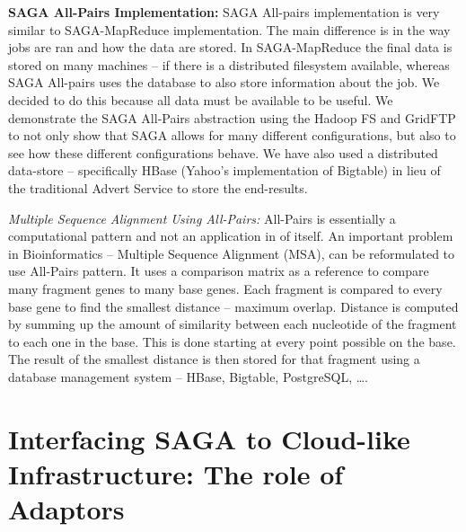 \documentclass[conference,final]{IEEEtran}
\newcommand{\sagamapreduce }{SAGA-MapReduce }
\begin{document}

{\bf SAGA All-Pairs Implementation: } SAGA All-pairs implementation is
very similar to \sagamapreduce implementation.  The main difference is
in the way jobs are ran and how the data are stored.  In
\sagamapreduce the final data is stored on many machines -- if there
is a distributed filesystem available, whereas SAGA All-pairs uses the
database to also store information about the job.  We decided to do
this because all data must be available to be useful. We demonstrate 
the SAGA All-Pairs abstraction using the Hadoop FS and GridFTP to not 
only show that SAGA allows for many different configurations, but also to
see how these different configurations behave. We have also used a 
distributed data-store -- specifically HBase 
(Yahoo's implementation of Bigtable) in lieu of the traditional
Advert Service to store the end-results.


{\it Multiple Sequence Alignment Using All-Pairs:} All-Pairs is
essentially a computational pattern and not an application in of
itself. An important problem in Bioinformatics -- Multiple Sequence
Alignment (MSA), can be reformulated to use All-Pairs pattern. It uses
a comparison matrix as a reference to compare many fragment genes to
many base genes.  Each fragment is compared to every base gene to find
the smallest distance -- maximum overlap.  Distance is computed by
summing up the amount of similarity between each nucleotide of the
fragment to each one in the base.  This is done starting at every
point possible on the base. The result of the smallest distance is
then stored for that fragment using a database management system --
HBase, Bigtable, PostgreSQL, \ldots.


\section{Interfacing SAGA to Cloud-like Infrastructure: The role of
  Adaptors}
\end{document}
